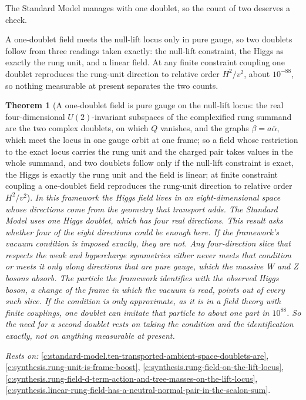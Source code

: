 \documentclass[11pt]{article}
\newtheorem{theorem}{Theorem}[section]
\theoremstyle{definition}
\theoremstyle{plain}
\begin{document}
The Standard Model manages with one doublet, so the count of two deserves a check.

A one-doublet field meets the null-lift locus only in pure gauge, so two doublets follow from three readings taken exactly: the null-lift constraint, the Higgs as exactly the rung unit, and a linear field. At any finite constraint coupling one doublet reproduces the rung-unit direction to relative order $H^{2}/v^{2}$, about $10^{-88}$, so nothing measurable at present separates the two counts.

\begin{theorem}[A one-doublet field is pure gauge on the null-lift locus: the real four-dimensional $U(2)$-invariant subspaces of the complexified rung summand are the two complex doublets, on which $Q$ vanishes, and the graphs $\beta = a\bar{\alpha}$, which meet the locus in one gauge orbit at one frame; so a field whose restriction to the exact locus carries the rung unit and the charged pair takes values in the whole summand, and two doublets follow only if the null-lift constraint is exact, the Higgs is exactly the rung unit and the field is linear; at finite constraint coupling a one-doublet field reproduces the rung-unit direction to relative order $H^{2}/v^{2}$]\label{c:synthesis.one-doublet-field-is-pure-gauge-on-the-null-lift-locus-so-two-doublets-need-the-exact-constraint}
In this framework the Higgs field lives in an eight-dimensional space whose directions come from the geometry that transport adds. The Standard Model uses one Higgs doublet, which has four real directions. This result asks whether four of the eight directions could be enough here. If the framework's vacuum condition is imposed exactly, they are not. Any four-direction slice that respects the weak and hypercharge symmetries either never meets that condition or meets it only along directions that are pure gauge, which the massive W and Z bosons absorb. The particle the framework identifies with the observed Higgs boson, a change of the frame in which the vacuum is read, points out of every such slice. If the condition is only approximate, as it is in a field theory with finite couplings, one doublet can imitate that particle to about one part in $10^{88}$. So the need for a second doublet rests on taking the condition and the identification exactly, not on anything measurable at present.
\end{theorem}
\noindent\emph{Rests on:} \ref{c:standard-model.ten-transported-ambient-space-doublets-are}, \ref{c:synthesis.rung-unit-is-frame-boost}, \ref{c:synthesis.rung-field-on-the-lift-locus}, \ref{c:synthesis.rung-field-d-term-action-and-tree-masses-on-the-lift-locus}, \ref{c:synthesis.linear-rung-field-has-a-neutral-normal-pair-in-the-scalon-sum}.
\end{document}
